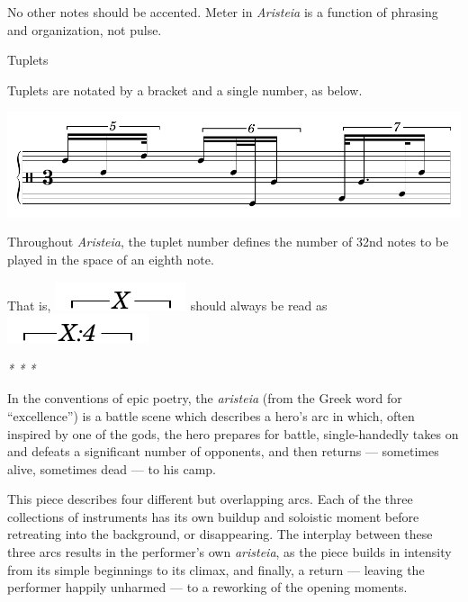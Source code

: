\documentclass{article}
\begin{document}
No other notes should be accented. Meter in {\it Aristeia} is a function of phrasing and organization, not pulse.

\vspace{1.5em}
{\large Tuplets}

Tuplets are notated by a bracket and a single number, as below.

\begin{center}
  \includegraphics[scale=.8]{./tuplets-cropped.pdf}
\end{center}

Throughout \textit{Aristeia}, the tuplet number defines the number of 32nd notes to be played in the space of an eighth note.

That is, \includegraphics[scale=.8]{./tuplet1.pdf} should always be read as \includegraphics[scale=.8]{./tuplet2.pdf}

\vfill

\begin{center}

  \textit{* \hspace{1em} * \hspace{1em} *}
  \vspace*{1\baselineskip}
\end{center}

  In the conventions of epic poetry, the \emph{aristeia} (from the Greek word for ``excellence'') is a battle scene which describes a hero’s arc in which, often inspired by one of the gods, the hero prepares for battle, single-handedly takes on and defeats a significant number of opponents, and then returns — sometimes alive, sometimes dead — to his camp.

This piece describes four different but overlapping arcs. Each of the three collections of instruments has its own buildup and soloistic moment before retreating into the background, or disappearing. The interplay between these three arcs results in the performer’s own \emph{aristeia}, as the piece builds in intensity from its simple beginnings to its climax, and finally, a return — leaving the performer happily unharmed — to a reworking of the opening moments.
\end{document}

